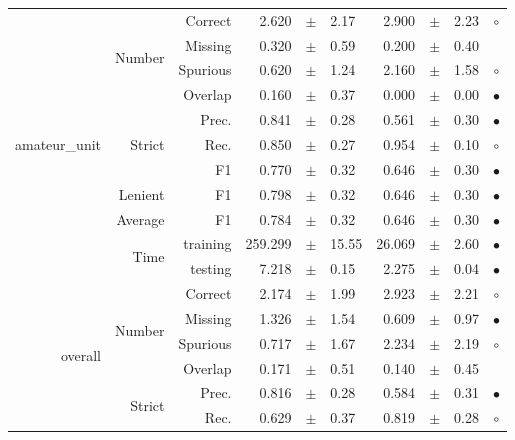 \begin{longtable}{|r|r|r||rcl|rcl|c|}
\hline
\hline
\multirow{11}{*}{\begin{sideways}amateur\_unit\end{sideways} } & \multirow{4}{*}{Number} &  Correct  & 2.620 &  $\pm$  & 2.17 & 2.900 &  $\pm$  & 2.23 &  $\circ$\\
\cline{3-10}
  &  &  Missing  & 0.320 &  $\pm$  & 0.59 & 0.200 &  $\pm$  & 0.40 &   \\
\cline{3-10}
  &  &  Spurious  & 0.620 &  $\pm$  & 1.24 & 2.160 &  $\pm$  & 1.58 &  $\circ$\\
\cline{3-10}
  &  &  Overlap  & 0.160 &  $\pm$  & 0.37 & 0.000 &  $\pm$  & 0.00 &  $\bullet$\\
\cline{2-10}
  & \multirow{3}{*}{Strict} &  Prec.  & 0.841 &  $\pm$  & 0.28 & 0.561 &  $\pm$  & 0.30 &  $\bullet$\\
\cline{3-10}
  &  &  Rec.  & 0.850 &  $\pm$  & 0.27 & 0.954 &  $\pm$  & 0.10 &  $\circ$\\
\cline{3-10}
  &  &  F1  & 0.770 &  $\pm$  & 0.32 & 0.646 &  $\pm$  & 0.30 &  $\bullet$\\
\cline{2-10}
  & Lenient &  F1  & 0.798 &  $\pm$  & 0.32 & 0.646 &  $\pm$  & 0.30 &  $\bullet$\\
\cline{2-10}
  & Average &  F1  & 0.784 &  $\pm$  & 0.32 & 0.646 &  $\pm$  & 0.30 &  $\bullet$\\
\cline{2-10}
  & \multirow{2}{*}{Time} &  training  & 259.299 &  $\pm$  & 15.55 & 26.069 &  $\pm$  & 2.60 &  $\bullet$\\
\cline{3-10}
  &  &  testing  & 7.218 &  $\pm$  & 0.15 & 2.275 &  $\pm$  & 0.04 &  $\bullet$\\
\hline
\hline
\multirow{11}{*}{\begin{sideways}overall\end{sideways} } & \multirow{4}{*}{Number} &  Correct  & 2.174 &  $\pm$  & 1.99 & 2.923 &  $\pm$  & 2.21 &  $\circ$\\
\cline{3-10}
  &  &  Missing  & 1.326 &  $\pm$  & 1.54 & 0.609 &  $\pm$  & 0.97 &  $\bullet$\\
\cline{3-10}
  &  &  Spurious  & 0.717 &  $\pm$  & 1.67 & 2.234 &  $\pm$  & 2.19 &  $\circ$\\
\cline{3-10}
  &  &  Overlap  & 0.171 &  $\pm$  & 0.51 & 0.140 &  $\pm$  & 0.45 &  \\
\cline{2-10}
  & \multirow{3}{*}{Strict} &  Prec.  & 0.816 &  $\pm$  & 0.28 & 0.584 &  $\pm$  & 0.31 &  $\bullet$\\
\cline{3-10}
  &  &  Rec.  & 0.629 &  $\pm$  & 0.37 & 0.819 &  $\pm$  & 0.28 &  $\circ$\\

\end{longtable}
